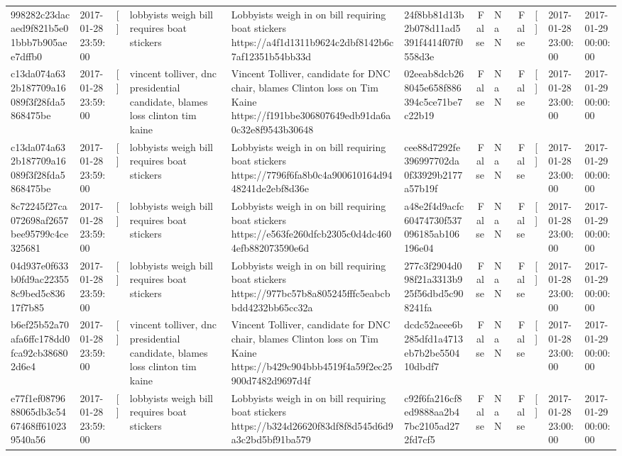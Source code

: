 \begin{tabular}{llllllrlrlll}
998282c23dacaed9f821b5e01bbb7b905aee7dffb0 & 2017-01-28 23:59:00 & [] & lobbyists weigh bill requires boat stickers & Lobbyists weigh in on bill requiring boat stickers https://a4f1d1311b9624c2dbf8142b6c7af12351b54bb33d & 24f8bb81d13b2b078d11ad5391f4414f07f0558d3e & False & NaN & False & [] & 2017-01-28 23:00:00 & 2017-01-29 00:00:00 \\
c13da074a632b187709a16089f3f28fda5868475be & 2017-01-28 23:59:00 & [] & vincent tolliver, dnc presidential candidate, blames loss clinton tim kaine & Vincent Tolliver, candidate for DNC chair, blames Clinton loss on Tim Kaine https://f191bbe306807649edb91da6a0c32e8f9543b30648 & 02eeab8dcb268045e658f886394c5ce71be7c22b19 & False & NaN & False & [] & 2017-01-28 23:00:00 & 2017-01-29 00:00:00 \\
c13da074a632b187709a16089f3f28fda5868475be & 2017-01-28 23:59:00 & [] & lobbyists weigh bill requires boat stickers & Lobbyists weigh in on bill requiring boat stickers https://7796f6fa8b0c4a900610164d9448241de2ebf8d36e & cee88d7292fe396997702da0f33929b2177a57b19f & False & NaN & False & [] & 2017-01-28 23:00:00 & 2017-01-29 00:00:00 \\
8c72245f27ca072698af2657bee95799c4ce325681 & 2017-01-28 23:59:00 & [] & lobbyists weigh bill requires boat stickers & Lobbyists weigh in on bill requiring boat stickers https://e563fe260dfcb2305c0d4dc4604efb882073590e6d & a48e2f4d9acfc60474730f537096185ab106196e04 & False & NaN & False & [] & 2017-01-28 23:00:00 & 2017-01-29 00:00:00 \\
04d937e0f633b0fd9ac223558c9bed5c83617f7b85 & 2017-01-28 23:59:00 & [] & lobbyists weigh bill requires boat stickers & Lobbyists weigh in on bill requiring boat stickers https://977bc57b8a805245fffc5eabcbbdd4232bb65cc32a & 277c3f2904d098f21a3313b925f56dbd5c908241fa & False & NaN & False & [] & 2017-01-28 23:00:00 & 2017-01-29 00:00:00 \\
b6ef25b52a70afa6ffc178dd0fca92cb386802d6e4 & 2017-01-28 23:59:00 & [] & vincent tolliver, dnc presidential candidate, blames loss clinton tim kaine & Vincent Tolliver, candidate for DNC chair, blames Clinton loss on Tim Kaine https://b429c904bbb4519f4a59f2ec25900d7482d9697d4f & dcdc52aeee6b285dfd1a4713eb7b2be550410dbdf7 & False & NaN & False & [] & 2017-01-28 23:00:00 & 2017-01-29 00:00:00 \\
e77f1ef0879688065db3c5467468ff610239540a56 & 2017-01-28 23:59:00 & [] & lobbyists weigh bill requires boat stickers & Lobbyists weigh in on bill requiring boat stickers https://b324d26620f83df8f8d545d6d9a3c2bd5bf91ba579 & c92f6fa216cf8ed9888aa2b47bc2105ad272fd7cf5 & False & NaN & False & [] & 2017-01-28 23:00:00 & 2017-01-29 00:00:00 \\

\end{tabular}
